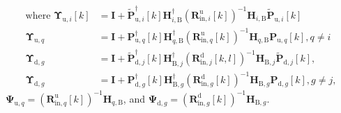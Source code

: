 \documentclass[9pt,journal]{IEEEtran}
\newcommand{\bracket}[1]{{\left [{#1}\right ]}}
\newcommand{\PqB}{\mathbf{P}_{\textrm{u},q}\bracket{k}}
\newcommand{\PqBH}{\mathbf{P}^\dagger_{\textrm{u},q}\bracket{k}}
\newcommand{\PBg}{\mathbf{P}_{\textrm{d},g}\bracket{k}}
\newcommand{\PBgH}{\mathbf{P}^\dagger_{\textrm{d},g}\bracket{k}}
\newcommand{\Rinjin}{\left( \mathbf{R}^\textrm{d}_{\mathrm{in},j}\bracket{k,l}\right)^{-1}}
\newcommand{\Ringin}{\left( \mathbf{R}^\textrm{d}_{\mathrm{in},g}\bracket{k}\right)^{-1}}
\newcommand{\Riniin}{\left( \mathbf{R}^\textrm{u}_{\mathrm{in},i}\bracket{k}\right)^{-1}}
\newcommand{\Rinqin}{\left( \mathbf{R}^\textrm{u}_{\mathrm{in},q}\bracket{k}\right)^{-1}}
\newcommand{\HBj}{\mathbf{H}_{\textrm{B},j}}
\newcommand{\HBjH}{\mathbf{H}^\dagger_{\textrm{B},j}}
\newcommand{\HBg}{\mathbf{H}_{\textrm{B},g}}
\newcommand{\HBgH}{\mathbf{H}^\dagger_{\textrm{B},g}}
\newcommand{\HqB}{\mathbf{H}_{q,\textrm{B}}}
\newcommand{\HqBH}{\mathbf{H}^\dagger_{q,\textrm{B}}}
\begin{document}
\begin{align}
\textrm{where }\boldsymbol{\Upsilon}_{\textrm{u},i}\bracket{k}&=\mathbf{I}+\widetilde{\mathbf{P}}^\dagger_{\textrm{u},i}\bracket{k}\mathbf{H}^\dagger_{i,\textrm{B}}\Riniin\mathbf{H}_{i,\textrm{B}}\widetilde{\mathbf{P}}_{\textrm{u},i}\bracket{k}\nonumber\\
\boldsymbol{\Upsilon}_{\textrm{u},q}&=\mathbf{I}+\PqBH\HqBH\Rinqin \HqB\PqB,q\neq i\nonumber\\
\boldsymbol{\Upsilon}_{\textrm{d},g}&=\mathbf{I}+ \widetilde{\mathbf{P}}^\dagger_{\textrm{d},j}\bracket{k}\HBjH \Rinjin\HBj\widetilde{\mathbf{P}}_{\textrm{d},j}\bracket{k},\nonumber\\
\boldsymbol{\Upsilon}_{\textrm{d},g}&= \mathbf{I}+\PBgH\HBgH\Ringin\HBg\PBg, g\neq j,\nonumber
\end{align}\normalsize
 $\boldsymbol{\Psi}_{\textrm{u},q}=\Rinqin\HqB$, and $\boldsymbol{\Psi}_{\textrm{d},g}=\Ringin\HBg$.
\iffalse
\end{document}
